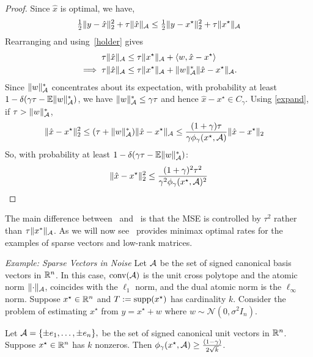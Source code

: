 \begin{proof}
Since $\hat{x}$ is optimal, we have,
\begin{equation*}
\tfrac{1}{2}\lVert y - \hat{x}\rVert_2^2 + \tau \lVert\hat{x}\rVert_{\mathcal{A}} \leq \tfrac{1}{2}\lVert y - x^\star\rVert_2^2 + \tau \lVert x^\star\rVert_{\mathcal{A}}
\end{equation*}
Rearranging and using~\eqref{holder} gives
\begin{align}
\label{pro:optimality}\tau \lVert\hat{x}\rVert_{\mathcal{A}} &\leq \tau \lVert x^\star\rVert_{\mathcal{A}} + \langle w, \hat{x} - x^\star \rangle\\
\implies \tau\lVert\hat{x}\rVert_{\mathcal{A}} &\leq \tau\lVert x^\star\rVert_{\mathcal{A}} + \lVert w\rVert_{\mathcal{A}}^* \lVert\hat{x} - x^\star\rVert_{\mathcal{A}}.
\end{align} 
Since $\lVert w\rVert_{\mathcal{A}}^*$ concentrates about its expectation, with
probability at least $1-\delta(\gamma\tau - \operatorname{\mathbb{E}}\lVert w\rVert_{\mathcal{A}}^*)$, we have $\lVert w\rVert_{\mathcal{A}}^* \leq \gamma \tau$ and hence $\hat{x} - x^\star \in
C_\gamma$.
Using \eqref{expand}, if $\tau > \lVert w\rVert_{\mathcal{A}}^*$, 
\begin{align*}
\lVert\hat{x}-x^\star\rVert_2^2 & \leq (\tau + \lVert w\rVert_{\mathcal{A}}^*)\lVert\hat{x}-x^\star\rVert_{\mathcal{A}} \leq \frac{(1+\gamma) \tau}{\gamma\phi_\gamma(x^\star,\mathcal{A})}\lVert\hat{x}-x^\star\rVert_2
\end{align*}
So, with probability at least $1-\delta(\gamma\tau - \operatorname{\mathbb{E}}\lVert w\rVert_{\mathcal{A}}^*)$:
\begin{equation*}\belowdisplayskip=-10pt
\vnorm{\hat{x}-x^\star}_2^2  \leq \frac{(1+\gamma)^2 \tau^2}{\gamma^2 \phi_\gamma(x^\star,\A)^2}
\end{equation*}
\end{proof}

The main difference between~ and~ is that the
MSE is controlled by $\tau^2$ rather than $\tau \| x^*\|_{\mathcal{A}}$.
As we will now see~ provides minimax optimal rates for the
examples of sparse vectors and low-rank matrices.

\emph{Example: Sparse Vectors in Noise}
Let $\mathcal{A}$ be the set of signed canonical basis
vectors in $\mathbb{R}^n$. In this case, $\operatorname{conv}(\mathcal{A})$ is the unit cross polytope and the
atomic norm $\lVert\cdot\rVert_{\mathcal{A}}$, coincides with the $\ell_1$ norm, and the dual
atomic norm is the $\ell_\infty$ norm. Suppose $x^\star \in \mathbb{R}^n$ and $T :=
\operatorname{supp}(x^\star)$ has cardinality $k$. Consider the problem of estimating
$x^\star$ from $y = x^\star + w$ where $w \sim \mathcal{N}(0,\sigma^2 I_n).$


\begin{prop}
Let $\mathcal{A} = \{\pm e_1, \ldots, \pm e_n\},$  be the set of signed canonical unit vectors in $\mathbb{R}^n$. Suppose $x^\star \in \mathbb{R}^n$ has $k$ nonzeros.  Then $\phi_\gamma(x^\star,\mathcal{A}) \geq \frac{(1-\gamma)}{2\sqrt{k}}$.
\end{prop}

